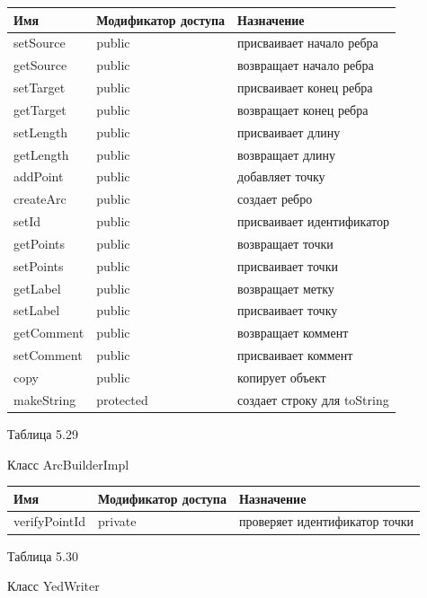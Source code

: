 \documentclass{../TechDoc}
\begin{document}
	\begin{tabular}{|p{5cm}|p{5cm}|p{5cm}|}
		\hline
		\textbf{Имя} & \textbf{Модификатор доступа} & \textbf{Назначение} \\
		\hline
		setSource&public & присваивает начало ребра\\
		\hline
		getSource&public & возвращает начало ребра\\
		\hline
		setTarget&public & присваивает конец ребра\\
		\hline
		getTarget&public & возвращает конец ребра\\
		\hline
		setLength&public & присваивает длину\\
		\hline
		getLength&public & возвращает длину\\
		\hline
		addPoint&public & добавляет точку\\
		\hline
		createArc&public & создает ребро\\
		\hline
		setId& public& присваивает идентификатор\\
		\hline
		getPoints&public & возвращает точки\\
		\hline
		setPoints&public & присваивает точки\\
		\hline
		getLabel&public & возвращает метку\\
		\hline
		setLabel&public & присваивает точку\\
		\hline
		getComment&public & возвращает коммент\\
		\hline
		setComment&public & присваивает коммент\\
		\hline
		copy&public & копирует объект\\
		\hline
		makeString& protected& создает строку для toString\\
		
		\hline
	\end{tabular}
	\begin{flushright}
		Таблица 5.29
	\end{flushright}
	Класс ArcBuilderImpl
	
	\begin{tabular}{|p{5cm}|p{5cm}|p{5cm}|}
		\hline
		\textbf{Имя} & \textbf{Модификатор доступа} & \textbf{Назначение} \\
		\hline
		verifyPointId& private & проверяет идентификатор точки \\
		
		\hline
	\end{tabular}
	\begin{flushright}
		Таблица 5.30
	\end{flushright}
	Класс YedWriter
	
\end{document}
